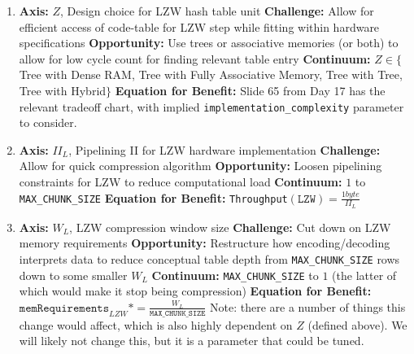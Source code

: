 \documentclass{article}
\begin{document}
\begin{enumerate}
\begin{enumerate}
\item%

\textbf{Axis:} $Z$, Design choice for LZW hash table unit
\newline
\textbf{Challenge:} Allow for efficient access of code-table for LZW step while fitting within hardware specifications
\newline
\textbf{Opportunity:} Use trees or associative memories (or both) to allow for low cycle count for finding relevant table entry
\newline
\textbf{Continuum:} $Z\in\{$Tree with Dense RAM, Tree with Fully Associative Memory, Tree with Tree, Tree with Hybrid$\}$
\newline
\textbf{Equation for Benefit:} Slide 65 from Day 17 has the relevant tradeoff chart, with implied \texttt{implementation\_complexity} parameter to consider.

\item%

\textbf{Axis:} $II_L$, Pipelining II for LZW hardware implementation
\newline
\textbf{Challenge:} Allow for quick compression algorithm
\newline
\textbf{Opportunity:} Loosen pipelining constraints for LZW to reduce computational load
\newline
\textbf{Continuum:} $1$ to \texttt{MAX\_CHUNK\_SIZE}
\newline
\textbf{Equation for Benefit:} \texttt{Throughput}$\left(\texttt{LZW}\right)=\frac{1 byte}{II_L}$

\item%

\textbf{Axis:} $W_L$, LZW compression window size
\newline
\textbf{Challenge:} Cut down on LZW memory requirements
\newline
\textbf{Opportunity:} Restructure how encoding/decoding interprets data to reduce conceptual table depth from \texttt{MAX\_CHUNK\_SIZE} rows down to some smaller $W_L$
\newline
\textbf{Continuum:} \texttt{MAX\_CHUNK\_SIZE} to $1$ (the latter of which would make it stop being compression)
\newline
\textbf{Equation for Benefit:} $\texttt{memRequirements}_{LZW} *= \frac{W_L}{\texttt{MAX\_CHUNK\_SIZE}}$\newline
Note: there are a number of things this change would affect, which is also highly dependent on $Z$ (defined above). We will likely not change this, but it is a parameter that could be tuned.


\end{enumerate}
\end{enumerate}
\end{document}
